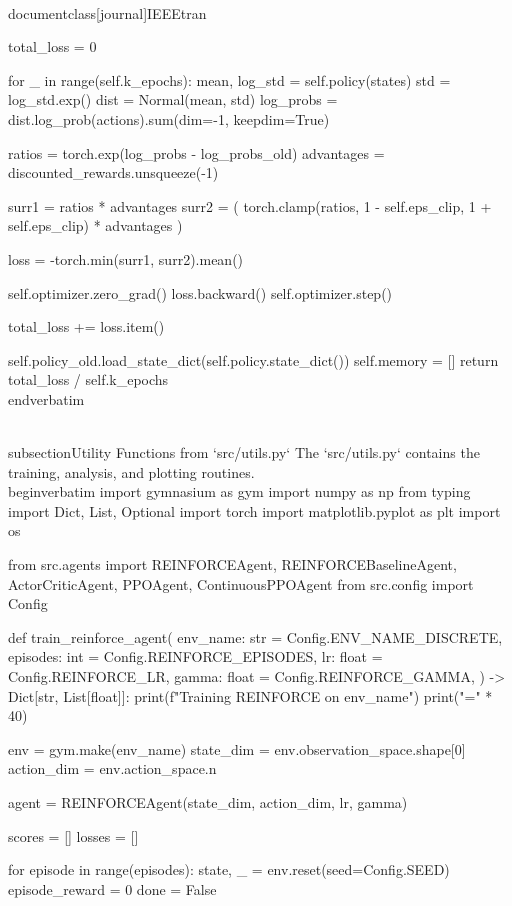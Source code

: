 \\documentclass[journal]{IEEEtran}
\begin{document}
        total_loss = 0

        for _ in range(self.k_epochs):
            mean, log_std = self.policy(states)
            std = log_std.exp()
            dist = Normal(mean, std)
            log_probs = dist.log_prob(actions).sum(dim=-1, keepdim=True)

            ratios = torch.exp(log_probs - log_probs_old)
            advantages = discounted_rewards.unsqueeze(-1)

            surr1 = ratios * advantages
            surr2 = (
                torch.clamp(ratios, 1 - self.eps_clip, 1 + self.eps_clip) * advantages
            )

            loss = -torch.min(surr1, surr2).mean()

            self.optimizer.zero_grad()
            loss.backward()
            self.optimizer.step()

            total_loss += loss.item()

        self.policy_old.load_state_dict(self.policy.state_dict())
        self.memory = []
        return total_loss / self.k_epochs
\\end{verbatim}

\\subsection{Utility Functions from `src/utils.py`}
The `src/utils.py` contains the training, analysis, and plotting routines.
\\begin{verbatim}
import gymnasium as gym
import numpy as np
from typing import Dict, List, Optional
import torch
import matplotlib.pyplot as plt
import os

from src.agents import REINFORCEAgent, REINFORCEBaselineAgent, ActorCriticAgent, PPOAgent, ContinuousPPOAgent
from src.config import Config

def train_reinforce_agent(
    env_name: str = Config.ENV_NAME_DISCRETE,
    episodes: int = Config.REINFORCE_EPISODES,
    lr: float = Config.REINFORCE_LR,
    gamma: float = Config.REINFORCE_GAMMA,
) -> Dict[str, List[float]]:
    print(f"Training REINFORCE on {env_name}")
    print("=" * 40)

    env = gym.make(env_name)
    state_dim = env.observation_space.shape[0]
    action_dim = env.action_space.n

    agent = REINFORCEAgent(state_dim, action_dim, lr, gamma)

    scores = []
    losses = []

    for episode in range(episodes):
        state, _ = env.reset(seed=Config.SEED)
        episode_reward = 0
        done = False
\end{document}
